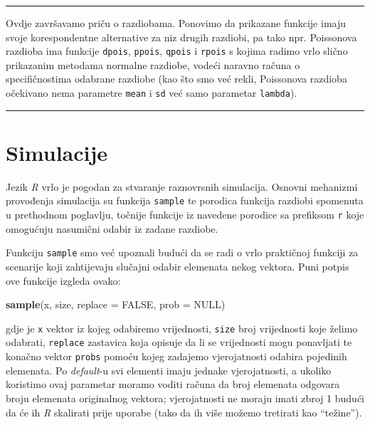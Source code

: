 \documentclass[]{book}
\newenvironment{Shaded}{\begin{snugshade}}{\end{snugshade}}
\newcommand{\KeywordTok}[1]{\textcolor[rgb]{0.13,0.29,0.53}{\textbf{#1}}}
\newcommand{\DataTypeTok}[1]{\textcolor[rgb]{0.13,0.29,0.53}{#1}}
\newcommand{\OtherTok}[1]{\textcolor[rgb]{0.56,0.35,0.01}{#1}}
\newcommand{\NormalTok}[1]{#1}
\theoremstyle{definition}
\theoremstyle{definition}
\theoremstyle{definition}
\theoremstyle{remark}
\begin{document}
\begin{center}\rule{0.5\linewidth}{\linethickness}\end{center}

Ovdje završavamo priču o razdiobama. Ponovimo da prikazane funkcije
imaju svoje korespondentne alternative za niz drugih razdiobi, pa tako
npr. Poissonova razdioba ima funkcije \texttt{dpois}, \texttt{ppois},
\texttt{qpois} i \texttt{rpois} s kojima radimo vrlo slično prikazanim
metodama normalne razdiobe, vodeći naravno računa o specifičnostima
odabrane razdiobe (kao što smo već rekli, Poissonova razdioba očekivano
nema parametre \texttt{mean} i \texttt{sd} već samo parametar
\texttt{lambda}).

\begin{center}\rule{0.5\linewidth}{\linethickness}\end{center}

\section{Simulacije}\label{simulacije}

Jezik \emph{R} vrlo je pogodan za stvaranje raznovrsnih simulacija.
Osnovni mehanizmi provođenja simulacija su funkcija \texttt{sample} te
porodica funkcija razdiobi spomenuta u prethodnom poglavlju, točnije
funkcije iz navedene porodice sa prefiksom \texttt{r} koje omogućuju
nasumični odabir iz zadane razdiobe.

Funkciju \texttt{sample} smo već upoznali budući da se radi o vrlo
praktičnoj funkciji za scenarije koji zahtijevaju slučajni odabir
elemenata nekog vektora. Puni potpis ove funkcije izgleda ovako:

\begin{Shaded}
\begin{Highlighting}[]
\KeywordTok{sample}\NormalTok{(x, size, }\DataTypeTok{replace =} \OtherTok{FALSE}\NormalTok{, }\DataTypeTok{prob =} \OtherTok{NULL}\NormalTok{)}
\end{Highlighting}
\end{Shaded}

gdje je \texttt{x} vektor iz kojeg odabiremo vrijednosti, \texttt{size}
broj vrijednosti koje želimo odabrati, \texttt{replace} zastavica koja
opisuje da li se vrijednosti mogu ponavljati te konačno vektor
\texttt{probs} pomoću kojeg zadajemo vjerojatnosti odabira pojedinih
elemenata. Po \emph{default}-u svi elementi imaju jednake vjerojatnosti,
a ukoliko koristimo ovaj parametar moramo voditi računa da broj
elemenata odgovara broju elemenata originalnog vektora; vjerojatnosti ne
moraju imati zbroj 1 budući da će ih \emph{R} skalirati prije uporabe
(tako da ih više možemo tretirati kao ``težine'').
\end{document}
